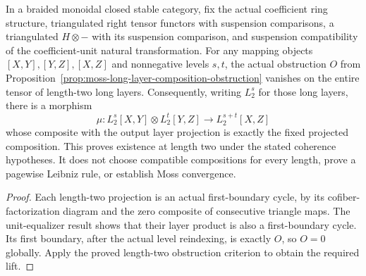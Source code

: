 \begin{proposition}
  \label{prop:moss-long-layer-two-composition}
  \leanok
  In a braided monoidal closed stable category, fix the actual coefficient
  ring structure, triangulated right tensor functors with suspension
  comparisons, a triangulated $H\otimes-$ with its suspension comparison,
  and suspension compatibility of the coefficient-unit natural
  transformation.  For any mapping objects $[X,Y],[Y,Z],[X,Z]$ and
  nonnegative levels $s,t$, the actual obstruction $O$ from
  Proposition~\ref{prop:moss-long-layer-composition-obstruction} vanishes
  on the entire tensor of length-two long layers.  Consequently, writing
  $L_2^s$ for those long layers, there is a morphism
  \[
    \mu:L_2^s[X,Y]\otimes L_2^t[Y,Z]\longrightarrow L_2^{s+t}[X,Z]
  \]
  whose composite with the output layer projection is exactly the fixed
  projected composition.
  This proves existence at length two under the stated coherence
  hypotheses.  It does not choose compatible compositions for every
  length, prove a pagewise Leibniz rule, or establish Moss convergence.
\end{proposition}
\begin{proof}
  \leanok
  Each length-two projection is an actual first-boundary cycle, by its
  cofiber-factorization diagram and the zero composite of consecutive
  triangle maps.  The unit-equalizer result shows that their layer product
  is also a first-boundary cycle.  Its first boundary, after the actual
  level reindexing, is exactly $O$, so $O=0$ globally.  Apply the proved
  length-two obstruction criterion to obtain the required lift.
\end{proof}


